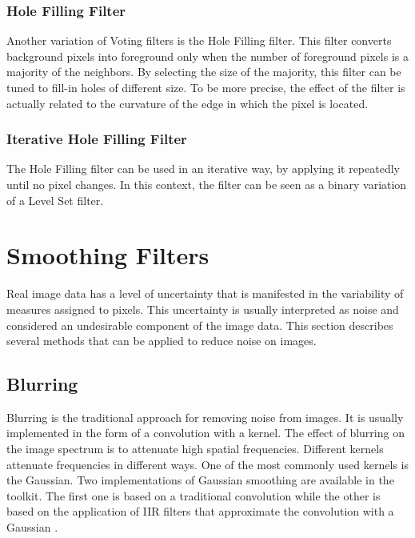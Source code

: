 \subsubsection{Hole Filling Filter}

Another variation of Voting filters is the Hole Filling filter. This filter
converts background pixels into foreground only when the number of foreground
pixels is a majority of the neighbors. By selecting the size of the majority,
this filter can be tuned to fill-in holes of different size. To be more
precise, the effect of the filter is actually related to the curvature of the
edge in which the pixel is located.

\ifitkFullVersion

\fi


\subsubsection{Iterative Hole Filling Filter}

The Hole Filling filter can be used in an iterative way, by applying it
repeatedly until no pixel changes. In this context, the filter can be seen as a
binary variation of a Level Set filter.

\ifitkFullVersion

\fi

\section{Smoothing Filters}
\label{sec:SmoothingFilters}

Real image data has a level of uncertainty that is manifested in the
variability of measures assigned to pixels. This uncertainty is usually
interpreted as noise and considered an undesirable component of the image
data. This section describes several methods that can be applied to reduce
noise on images.

\subsection{Blurring}
\label{sec:BlurringFilters}

Blurring is the traditional approach for removing noise from images. It is
usually implemented in the form of a convolution with a kernel. The effect of
blurring on the image spectrum is to attenuate high spatial
frequencies.  Different kernels attenuate frequencies in different ways. One
of the most commonly used kernels is the Gaussian. Two implementations of
Gaussian smoothing are available in the toolkit. The first one is based on a
traditional convolution while the other is based on the application of IIR
filters that approximate the convolution with a Gaussian
\cite{Deriche1990,Deriche1993}.


